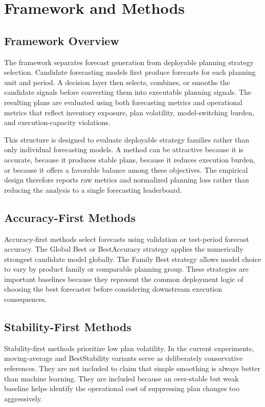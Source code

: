 \section{Framework and Methods}

\subsection{Framework Overview}

The framework separates forecast generation from deployable planning strategy selection. Candidate forecasting models first produce forecasts for each planning unit and period. A decision layer then selects, combines, or smooths the candidate signals before converting them into executable planning signals. The resulting plans are evaluated using both forecasting metrics and operational metrics that reflect inventory exposure, plan volatility, model-switching burden, and execution-capacity violations.

This structure is designed to evaluate deployable strategy families rather than only individual forecasting models. A method can be attractive because it is accurate, because it produces stable plans, because it reduces execution burden, or because it offers a favorable balance among these objectives. The empirical design therefore reports raw metrics and normalized planning loss rather than reducing the analysis to a single forecasting leaderboard.

\subsection{Accuracy-First Methods}

Accuracy-first methods select forecasts using validation or test-period forecast accuracy. The Global Best or BestAccuracy strategy applies the numerically strongest candidate model globally. The Family Best strategy allows model choice to vary by product family or comparable planning group. These strategies are important baselines because they represent the common deployment logic of choosing the best forecaster before considering downstream execution consequences.

\subsection{Stability-First Methods}

Stability-first methods prioritize low plan volatility. In the current experiments, moving-average and BestStability variants serve as deliberately conservative references. They are not included to claim that simple smoothing is always better than machine learning. They are included because an over-stable but weak baseline helps identify the operational cost of suppressing plan changes too aggressively.

